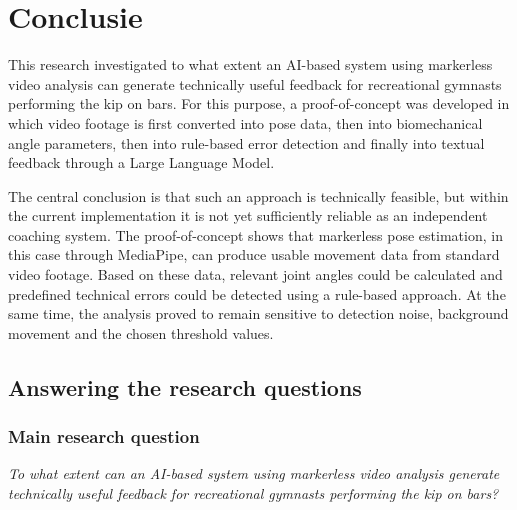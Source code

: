 
\chapter{Conclusie}%
\label{ch:conclusie}

This research investigated to what extent an AI-based system using markerless video analysis can generate technically useful feedback for recreational gymnasts performing the kip on bars. For this purpose, a proof-of-concept was developed in which video footage is first converted into pose data, then into biomechanical angle parameters, then into rule-based error detection and finally into textual feedback through a Large Language Model.

The central conclusion is that such an approach is technically feasible, but within the current implementation it is not yet sufficiently reliable as an independent coaching system. The proof-of-concept shows that markerless pose estimation, in this case through MediaPipe, can produce usable movement data from standard video footage. Based on these data, relevant joint angles could be calculated and predefined technical errors could be detected using a rule-based approach. At the same time, the analysis proved to remain sensitive to detection noise, background movement and the chosen threshold values.

\section{Answering the research questions}

\subsection{Main research question}

\textit{To what extent can an AI-based system using markerless video analysis generate technically useful feedback for recreational gymnasts performing the kip on bars?}


